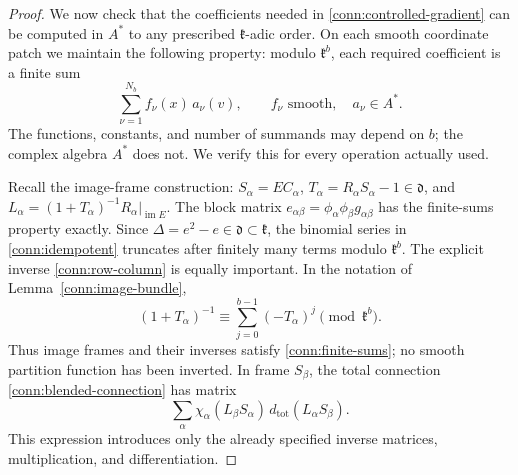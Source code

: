 \begin{proof}
We now check that the coefficients needed in
\eqref{conn:controlled-gradient} can be computed in \(A^*\) to
any prescribed \(\mathfrak k\)-adic order.  On each smooth
coordinate patch we maintain the following property:
modulo \(\mathfrak k^b\), each required coefficient is a finite
sum
\begin{equation}
 \sum_{\nu=1}^{N_b} f_\nu(x)\,a_\nu(v),
       \qquad f_\nu\text{ smooth},\quad a_\nu\in A^* .
 \label{conn:finite-sums}
\end{equation}
The functions, constants, and number of summands may depend
on \(b\); the complex algebra \(A^*\) does not.
We verify this for every operation actually used.

Recall the image-frame construction:
\(S_\alpha=EC_\alpha\),
\(T_\alpha=R_\alpha S_\alpha-1\in\mathfrak d\), and
\(L_\alpha=(1+T_\alpha)^{-1}R_\alpha|_{\operatorname{im}E}\).
The block matrix \(e_{\alpha\beta}=\phi_\alpha\phi_\beta
g_{\alpha\beta}\) has the finite-sums property exactly.  Since
\(\Delta=e^2-e\in\mathfrak d\subset\mathfrak k\),
the binomial series in \eqref{conn:idempotent} truncates after
finitely many terms modulo \(\mathfrak k^b\).  The explicit
inverse \eqref{conn:row-column} is equally important.  In the
notation of Lemma~\ref{conn:image-bundle},
\[
 (1+T_\alpha)^{-1}
       \equiv\sum_{j=0}^{b-1}(-T_\alpha)^j
                              \pmod{\mathfrak k^b}.
\]
Thus image frames and their inverses satisfy
\eqref{conn:finite-sums}; no smooth partition function has
been inverted.  In frame \(S_\beta\), the total connection
\eqref{conn:blended-connection} has matrix
\[
 \sum_\alpha\chi_\alpha
        (L_\beta S_\alpha)\,
                   d_{\mathrm{tot}}(L_\alpha S_\beta).
\]
This expression introduces only the already specified inverse
matrices, multiplication, and differentiation.


\end{proof}
